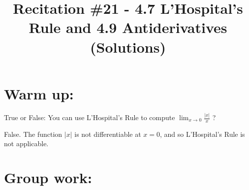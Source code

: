 \documentclass[nooutcomes]{ximera}
\title{Recitation \#21 - 4.7 L'Hospital's Rule and 4.9 Antiderivatives (Solutions)}
\begin{document}
\begin{abstract}		\end{abstract}
\maketitle

\section*{Warm up:} 
True or False:  You can use L'Hospital's Rule to compute $\lim_{x \to 0} \frac{|x|}{x}$ ?
		\begin{freeResponse}
		False.  The function $|x|$ is not differentiable at $x=0$, and so L'Hospital's Rule is not applicable.
		\end{freeResponse}	
		
		
		

	
	
	
	
	

\section*{Group work:}
\end{document}
